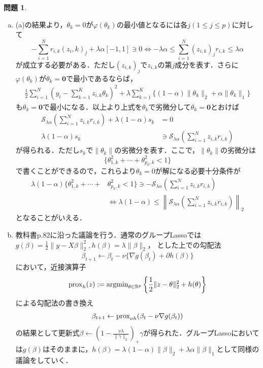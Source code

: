 \documentclass[titlepage]{jsarticle}
\theoremstyle{definition}
\newtheorem{Ex}{問題}
\theoremstyle{mystyle} %
\begin{document}
\begin{Ex}
\begin{enumerate}[(a)]
\item (a)の結果より，$\theta_k = 0$が$\varphi(\theta_k)$の最小値となるには各$j(1\leq j\leq p)$に対して
$$-\sum_{i=1}^N r_{i,k}(z_i,k)_j + \lambda \alpha[-1,1] \ni 0\Leftrightarrow -\lambda \alpha \leq \sum_{i=1}^N  (z_{i,k})_j r_{i,k} \leq \lambda \alpha$$
が成立する必要がある．ただし$(z_{i,k})_j$で$z_{i,k}$の第$j$成分を表す．さらに$\varphi(\theta_k)$が$\theta_k = {\bm 0}$で最小であるならば，
\begin{align*}
\frac{1}{2}\sum_{i=1}^N (y_i  - \sum_{k=1}^K z_{i,k}\theta_k)^2 + \lambda\sum_{k=1}^K\{(1-\alpha)\|\theta_k\|_2 + \alpha \|\theta_k\|_1\}
\end{align*}
も$\theta_k = {\bm 0}$で最小になる．以上より上式を$\theta_k$で劣微分して$\theta_k = {\bm 0}$とおけば
\begin{align*}
\mathcal{S}_{\lambda \alpha}\left(\sum_{i=1}^N z_{i,k}r_{i,k}\right ) + \lambda (1-\alpha)s_k& = 0\\
\lambda(1-\alpha)s_k &\ni \mathcal{S}_{\lambda\alpha}\left(\sum_{i=1}^N z_{i,k}r_{i,k}\right)
\end{align*}
が得られる．ただし$s_k$で$\|\theta_k \|$の劣微分を表す．ここで，$\|\theta_k \|$の劣微分は
$$\{\theta_{1,k}^2 + \cdots + \theta_{p_k ,k}^2 < 1\}$$
で書くことができるので，これらより$\theta_k = 0$が解になる必要十分条件が	
\begin{align*}
\lambda(1-\alpha)\{\theta_{1,k}^2 + \cdots +& \theta_{p_k ,k}^2 < 1\}\ni - \mathcal{S}_{\lambda\alpha}\left(\sum_{i=1}^N z_{i,k}r_{i,k}\right)\\
&\Leftrightarrow \lambda(1-\alpha)\leq \left\| \mathcal{S}_{\lambda\alpha}\left(\sum_{i=1}^N z_{i,k}r_{i,k}\right)\right\|_2
\end{align*}
となることがいえる．\\

\item 教科書p.82に沿った議論を行う．通常のグループLassoでは$g(\beta) = \frac{1}{2}\|y - X\beta\|_2^2,h(\beta) = \lambda \|\beta\|_2$，
とした上での勾配法
$$\beta_{t + 1}\leftarrow \beta_t -\nu\{\nabla g(\beta_t) + \partial h(\beta)\}$$
において，近接演算子
$${\rm prox }_h (z) :={\rm argmin}_{\theta \in \mathbb{R}^p}\left\{\frac{1}{2}\|z-\theta\|_2^2 + h(\theta)\right\}$$
による勾配法の書き換え
\begin{align}
\label{groupkoubai}
\beta_{t+1}\leftarrow {\rm prox }_{\nu h}(\beta_t - \nu\nabla g(\beta_t))
\end{align}
の結果として更新式$\beta\leftarrow \left(1-\frac{\nu\lambda}{\|\gamma\|_2}\right)_+ \gamma$が得られた．グループLassoにおいては$g(\beta)$はそのままに，$h(\beta) = \lambda(1-\alpha)\|\beta\|_2 + \lambda \alpha\|\beta\|_1$として同様の議論をしていく．\\


\end{enumerate}
\end{Ex}
\end{document}
